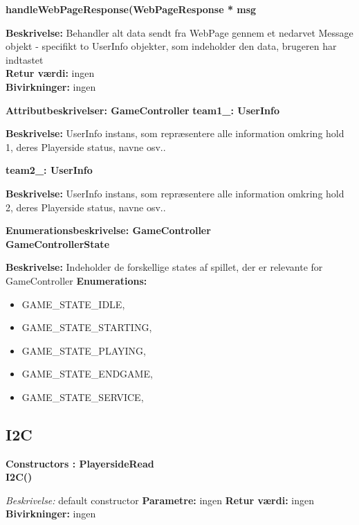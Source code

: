 \documentclass[Softwaredesign/Softwaredesign_main.tex]{subfiles}
\begin{document}
\textbf{handleWebPageResponse(WebPageResponse * msg}
\begin{adjustwidth}{1cm}{0pt}
\textbf{Beskrivelse:} Behandler alt data sendt fra WebPage gennem et nedarvet Message objekt - specifikt to UserInfo objekter, som indeholder den data, brugeren har indtastet\\[0.2cm]
\textbf{Retur værdi:} ingen \\[0.2cm]
\textbf{Bivirkninger:} ingen  \\[0.2cm]
\end{adjustwidth}

{\large\textbf{Attributbeskrivelser: GameController}}
\textbf{team1\_: UserInfo } 
\begin{adjustwidth}{1cm}{0pt}
\textbf{Beskrivelse:} UserInfo instans, som repræsentere alle information omkring hold 1, deres Playerside status, navne osv.. \\[0.2cm]
\end{adjustwidth}

\textbf{team2\_: UserInfo } 
\begin{adjustwidth}{1cm}{0pt}
\textbf{Beskrivelse:} UserInfo instans, som repræsentere alle information omkring hold 2, deres Playerside status, navne osv.. \\[0.2cm]
\end{adjustwidth}

{\large\textbf{Enumerationsbeskrivelse: GameController}}\\[0.2cm]
\textbf{GameControllerState}
\begin{adjustwidth}{1cm}{0pt}
\textbf{Beskrivelse:} Indeholder de forskellige states af spillet, der er relevante for GameController 
\textbf{Enumerations:}
\begin{itemize}
    \item GAME\_STATE\_IDLE,
	\item GAME\_STATE\_STARTING,
	\item GAME\_STATE\_PLAYING,
	\item GAME\_STATE\_ENDGAME,
	\item GAME\_STATE\_SERVICE,
\end{itemize}
\end{adjustwidth}

\subsection{I2C}
{\large\textbf{Constructors : PlayersideRead}}\\[0.2cm]
\textbf{I2C()}
\begin{adjustwidth}{1cm}{0pt}
\textit{Beskrivelse:} default constructor
\textbf{Parametre:} ingen
\textbf{Retur værdi:} ingen \\[0.2cm]
\textbf{Bivirkninger:} ingen \\[0.2cm]
\end{adjustwidth}
\end{document}

